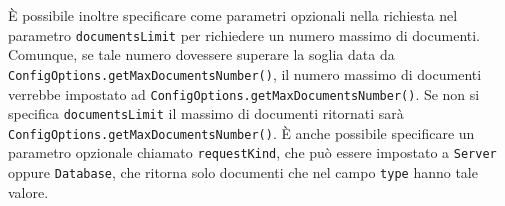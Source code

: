 È possibile inoltre specificare come parametri opzionali nella richiesta nel parametro \texttt{documentsLimit} per richiedere un numero massimo di documenti. Comunque, se tale numero dovessere superare la soglia data da \texttt{ConfigOptions.getMaxDocumentsNumber()}, il numero massimo di documenti verrebbe impostato ad \texttt{ConfigOptions.getMaxDocumentsNumber()}. Se non si specifica \texttt{documentsLimit} il massimo di documenti ritornati sarà \texttt{ConfigOptions.getMaxDocumentsNumber()}.
È anche possibile specificare un parametro opzionale chiamato \texttt{requestKind}, che può essere impostato a \texttt{Server} oppure \texttt{Database}, che ritorna solo documenti che nel campo \texttt{type} hanno tale valore. 
